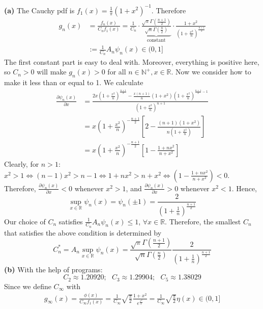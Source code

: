 \documentclass[11pt]{article}
\begin{document}
\textbf{(a)} The Cauchy pdf is $f_1(x)=\frac{1}{\pi}(1+x^2)^{-1}$. Therefore
\begin{equation}
    \begin{split}
        g_n(x) &= \frac{f_n(x)}{C_n f_1(x)} = \frac{1}{C_n}\cdot\underbrace{\frac{\sqrt{\pi}\Gamma(\frac{n+1}{2})}{\sqrt{n} \Gamma(\frac{n}{2})}}_{\text{constant}}\cdot \frac{1+x^2}{(1+\frac{x^2}{n})^{\frac{n+1}{2}}} \\
        &:=\frac{1}{C_n} A_n \psi_n(x)\in (0,1]
    \end{split}
\end{equation}
The first constant part is easy to deal with. Moreover, everything is positive here, so $C_n>0$ will make $g_n(x)>0$ for all $n\in \mathbb{N}^+,x \in \mathbb{R}$. Now we consider how to make it less than or equal to 1. We calculate
\begin{equation}
    \begin{split}
        \frac{\partial \psi_n(x)}{\partial x} &= \frac{2x(1+\frac{x^2}{n})^{\frac{n+1}{2}}-\frac{x(n+1)}{n}(1+x^2)(1+\frac{x^2}{n})^{\frac{n+1}{2}-1}}{(1+\frac{x^2}{n})^{n+1}}\\
        &=x\left(1+\frac{x^2}{n}\right)^{-\frac{n+1}{2}}\left[2 - \frac{(n+1)(1+x^2)}{n(1+\frac{x^2}{n})}\right]\\
        &=x\left(1+\frac{x^2}{n}\right)^{-\frac{n+1}{2}}\left[1 - \frac{1+nx^2}{n+x^2}\right]
    \end{split}
\end{equation}
Clearly, for $n>1$: $x^2 > 1 \iff (n-1)x^2 > n-1 \iff 1+nx^2>n+x^2 \iff \left(1 - \frac{1+nx^2}{n+x^2}\right) < 0$. Therefore, $\frac{\partial \psi_n(x)}{\partial x} < 0$ whenever $x^2 > 1$, and $\frac{\partial \psi_n(x)}{\partial x} > 0$ whenever $x^2 < 1$. Hence, 
$$
\sup\limits_{x\in \mathbb{R}} \psi_n(x) = \psi_n(\pm 1) = \frac{2}{(1+\frac{1}{n})^{\frac{n+1}{2}}}
$$
Our choice of $C_n$ satisfies $\frac{1}{C_n}A_n \psi_n(x) \leq 1$, $\forall x\in \mathbb{R}$. Therefore, the smallest $C_n$ that satisfies the above condition is determined by
\begin{equation}
    C_n^* = A_n \sup\limits_{x\in \mathbb{R}} \psi_n(x) = \frac{\sqrt{\pi}\Gamma(\frac{n+1}{2})}{\sqrt{n} \Gamma(\frac{n}{2})}\frac{2}{(1+\frac{1}{n})^{\frac{n+1}{2}}}
\end{equation}
\textbf{(b)} With the help of programs:
$$
C_2 \approx 1.20920;~~~C_3 \approx 1.29904;~~~C_5 \approx 1.38029
$$
Since we define $C_{\infty}$ with 
\begin{equation}
    \begin{split}
        g_{\infty}(x) = \frac{\phi(x)}{C_{\infty}f_1(x)} = \frac{1}{C_{\infty}}\sqrt{\frac{\pi}{2}}\frac{1+x^2}{e^{\frac{x^2}{2}}} = \frac{1}{C_{\infty}}\sqrt{\frac{\pi}{2}}\eta(x)\in (0,1]
    \end{split}
\end{equation}
\end{document}
